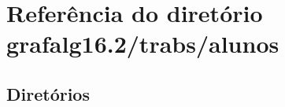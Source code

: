 \section{Referência do diretório grafalg16.2/trabs/alunos}
\label{dir_7c4841d7c51254bb38f983dc521d445f}
\subsection*{Diretórios}
\begin{DoxyCompactItemize}
\end{DoxyCompactItemize}
